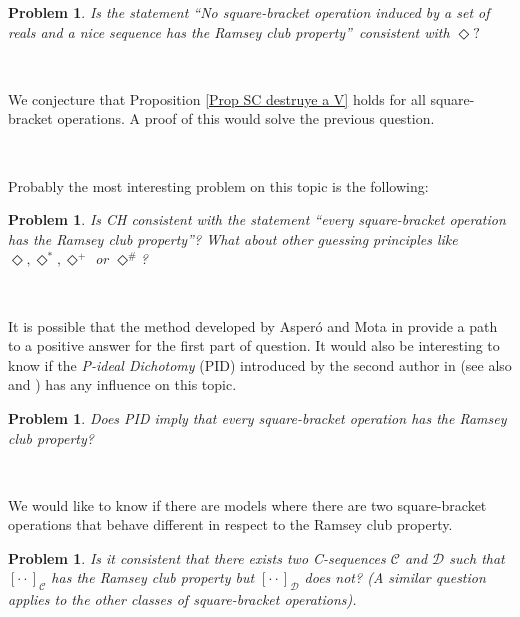 \documentclass{article}
\newtheorem{problem}[theorem]{Problem}
\begin{document}
\begin{problem}
Is the statement \textquotedblleft No square-bracket operation induced by a
set of reals and a nice sequence has the Ramsey club
property\textquotedblright\ consistent with $\mathsf{\Diamond?}$
\end{problem}

\qquad\ \ \qquad\qquad\qquad

We conjecture that Proposition \ref{Prop SC destruye a V} holds for all
square-bracket operations. A proof of this would solve the previous question.

\qquad\qquad\ \qquad\ \ 

Probably the most interesting problem on this topic is the following: \qquad\ \ \ \ 

\begin{problem}
Is \textsf{CH }consistent with the statement \textquotedblleft every
square-bracket operation has the Ramsey club property\textquotedblright? What
about other guessing principles like $\Diamond,\Diamond^{\ast},\Diamond^{+}$
or $\Diamond^{\#}$?
\end{problem}

\qquad\ \ \ \qquad\qquad\ \ \ 

It is possible that the method developed by Asper\'{o} and Mota in
\cite{FewNewReals} provide a path to a positive answer for the first part of
question. It would also be interesting to know if the \emph{P-ideal Dichotomy}
(\textsf{PID) }introduced by the second author in
\cite{ADichotomyforPIdealsofCountableSets}\textsf{ }(see also
\cite{PartitionPropertiesCompatiblewithCH} and \cite{NotesonForcingAxioms})
has any influence on this topic.

\begin{problem}
Does \textsf{PID }imply that every square-bracket operation has the Ramsey
club property?
\end{problem}

\qquad\ \qquad\ \ \ \qquad\ \ \ 

We would like to know if there are models where there are two square-bracket
operations that behave different in respect to the Ramsey club property.

\begin{problem}
Is it consistent that there exists two \textsf{C}-sequences $\mathcal{C}$ and
$\mathcal{D}$ such that $[\cdot\cdot]_{\mathcal{C}}$ has the Ramsey club
property but $[\cdot\cdot]_{\mathcal{D}}$ does not? (A similar question
applies to the other classes of square-bracket operations).
\end{problem}
\end{document}
